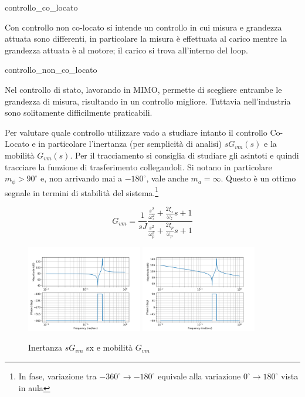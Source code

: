 {controllo_co_locato}

Con controllo non co-locato si intende un controllo in cui misura e grandezza attuata sono differenti, in particolare la misura è effettuata al carico mentre la grandezza attuata è al motore; il carico si trova all'interno del loop.

{controllo_non_co_locato}

Nel controllo di stato, lavorando in MIMO, permette di scegliere entrambe le grandezza di misura, risultando in un controllo migliore. Tuttavia nell'industria sono solitamente difficilmente praticabili. 

Per valutare quale controllo utilizzare vado a studiare intanto il controllo Co-Locato e in particolare l'inertanza (per semplicità di analisi) \(sG_{vm}(s)\) e la mobilità \(G_{vm}(s)\). Per il tracciamento si consiglia di studiare gli asintoti e quindi tracciare la funzione di trasferimento collegandoli.
Si notano in particolare \(m_\phi > 90^\circ\) e, non arrivando mai a \(-180^\circ\), vale anche \(m_a = \infty\). Questo è un ottimo segnale in termini di stabilità del sistema.\footnote{In fase, variazione tra \(-360^\circ\rightarrow -180^\circ\) equivale alla variazione \(0^\circ\rightarrow 180^\circ\) vista in aula}

\[G_{vm} = \frac{1}{sJ}\frac{\frac{s^2}{\omega^2_z} + \frac{2\xi_z}{\omega_z}s + 1}{\frac{s^2}{\omega^2_p} + \frac{2\xi_p}{\omega_p}s + 1}\]

\begin{figure}[h]
    \centering
    \includegraphics[width=0.45\textwidth]{Immagini/Inertanza_gvm.png}
    \includegraphics[width=0.45\textwidth]{Immagini/mobilita_gvm.png}
    \caption{Inertanza \(sG_{vm}\) sx e mobilità \(G_{vm}\)}
\end{figure}

